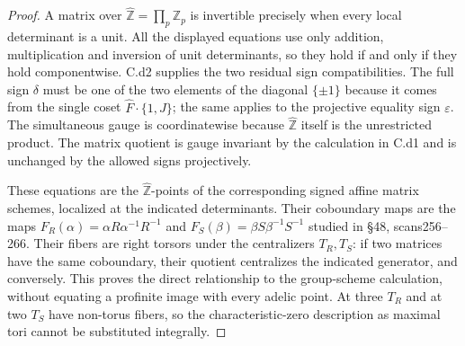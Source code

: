 \begin{proof}
A matrix over $\widehat{\mathbb Z}=\prod_p\mathbb Z_p$ is invertible precisely when every local determinant is a unit. All the displayed equations use only addition, multiplication and inversion of unit determinants, so they hold if and only if they hold componentwise. C.d2 supplies the two residual sign compatibilities. The full sign $\delta$ must be one of the two elements of the diagonal $\{\pm1\}$ because it comes from the single coset $\widehat F\cdot\{1,J\}$; the same applies to the projective equality sign $\varepsilon$. The simultaneous gauge is coordinatewise because $\widehat{\mathbb Z}$ itself is the unrestricted product. The matrix quotient is gauge invariant by the calculation in C.d1 and is unchanged by the allowed signs projectively.

These equations are the $\widehat{\mathbb Z}$-points of the corresponding signed affine matrix schemes, localized at the indicated determinants. Their coboundary maps are the maps $F_R(\alpha)=\alpha R\alpha^{-1}R^{-1}$ and $F_S(\beta)=\beta S\beta^{-1}S^{-1}$ studied in \S48, scans256--266. Their fibers are right torsors under the centralizers $T_R,T_S$: if two matrices have the same coboundary, their quotient centralizes the indicated generator, and conversely. This proves the direct relationship to the group-scheme calculation, without equating a profinite image with every adelic point. At three $T_R$ and at two $T_S$ have non-torus fibers, so the characteristic-zero description as maximal tori cannot be substituted integrally.
\end{proof}

